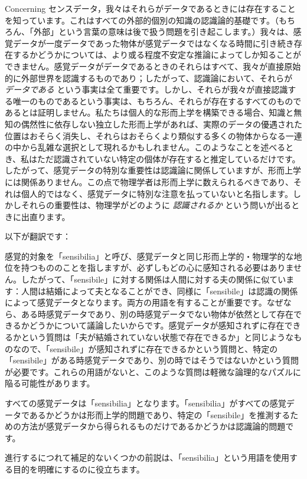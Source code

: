 \documentclass[a4paper,11pt,openany]{ltjsbook}
\begin{document}
Concerning センスデータ，我々はそれらがデータであるときには存在することを知っています。これはすべての外部的個別の知識の認識論的基礎です。（もちろん、「外部」という言葉の意味は後で扱う問題を引き起こします。）我々は、感覚データが一度データであった物体が感覚データではなくなる時間に引き続き存在するかどうかについては、より或る程度不安定な推論によってしか知ることができません。感覚データがデータであるときのそれらはすべて、我々が直接原始的に外部世界を認識するものであり；したがって、認識論において、それらが \textit{データである} という事実は全て重要です。しかし、それらが我々が直接認識する唯一のものであるという事実は、もちろん、それらが存在するすべてのものであるとは証明しません。私たちは個人的な形而上学を構築できる場合、知識と無知の偶然性に依存しない独立した形而上学があれば、実際のデータの優遇された位置はおそらく消失し、それらはおそらくより類似する多くの物体からなる一連の中から乱雑な選択として現れるかもしれません。このようなことを述べるとき、私はただ認識されていない特定の個体が存在すると推定しているだけです。したがって、感覚データの特別な重要性は認識論に関係していますが、形而上学には関係ありません。この点で物理学者は形而上学に数えられるべきであり、それは個人的ではなく、感覚データに特別な注意を払っていないと名指します。しかしそれらの重要性は、物理学がどのように \textit{認識されるか} という問いが出るときに出直ります。

以下が翻訳です：

感覚的対象を「sensibilia」と呼び、感覚データと同じ形而上学的・物理学的な地位を持つもののことを指しますが、必ずしもどの心に感知される必要はありません。したがって、「sensibile」に対する関係は人間に対する夫の関係に似ています：人間は結婚によって夫となることができ、同様に「sensibile」は認識の関係によって感覚データとなります。両方の用語を有することが重要です。なぜなら、ある時感覚データであり、別の時感覚データでない物体が依然として存在できるかどうかについて議論したいからです。感覚データが感知されずに存在できるかという質問は「夫が結婚されていない状態で存在できるか」と同じようなものなので、「sensibile」が感知されずに存在できるかという質問と、特定の「sensibile」がある時感覚データであり、別の時ではそうではないかという質問が必要です。これらの用語がないと、このような質問は軽微な論理的なパズルに陥る可能性があります。

すべての感覚データは「sensibilia」となります。「sensibilia」がすべての感覚データであるかどうかは形而上学的問題であり、特定の「sensibile」を推測するための方法が感覚データから得られるものだけであるかどうかは認識論的問題です。

進行するにつれて補足的ないくつかの前説は、「sensibilia」という用語を使用する目的を明確にするのに役立ちます。
\end{document}
